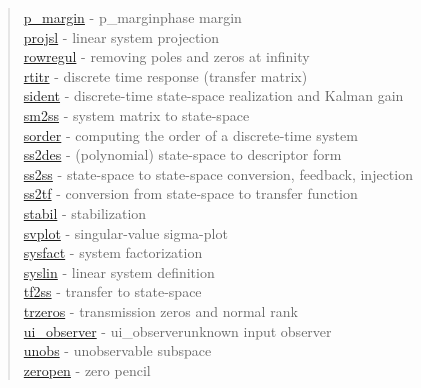 \begin{quote}
\hyperlink{p_margin}{p\_margin} - {p_margin}{phase margin} \\  
\hyperlink{projsl}{projsl} - {linear system projection} \\  
\hyperlink{rowregul}{rowregul} - {removing poles and zeros at infinity} \\  
\hyperlink{rtitr}{rtitr} - {discrete time response (transfer matrix)  } \\  
\hyperlink{sident}{sident} - {discrete-time state-space realization and Kalman gain} \\  
\hyperlink{sm2ss}{sm2ss} - {system matrix to state-space} \\  
\hyperlink{sorder}{sorder} - {computing the order of a discrete-time system} \\  
\hyperlink{ss2des}{ss2des} - {(polynomial) state-space to descriptor form} \\  
\hyperlink{ss2ss}{ss2ss} - {state-space to state-space conversion, feedback, injection} \\  
\hyperlink{ss2tf}{ss2tf} - {conversion from state-space to transfer function} \\  
\hyperlink{stabil}{stabil} - {stabilization} \\  
\hyperlink{svplot}{svplot} - {singular-value sigma-plot} \\  
\hyperlink{sysfact}{sysfact} - {system factorization} \\  
\hyperlink{syslin}{syslin} - {linear system definition} \\  
\hyperlink{tf2ss}{tf2ss} - {transfer to state-space} \\  
\hyperlink{trzeros}{trzeros} - {transmission zeros and normal rank} \\  
\hyperlink{ui_observer}{ui\_observer} - {ui_observer}{unknown input observer} \\  
\hyperlink{unobs}{unobs} - {unobservable subspace} \\  
\hyperlink{zeropen}{zeropen} - {zero pencil}
\end{quote}

